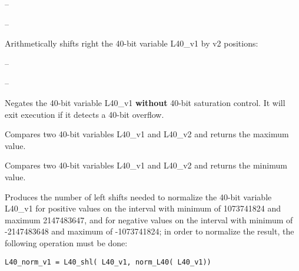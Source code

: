  -- 

 -- 


Arithmetically shifts right the 40-bit variable L40\_v1 by v2
positions: 

 -- 

 -- 


Negates the 40-bit variable L40\_v1 \textbf{without} 40-bit saturation
control. It will exit execution if it detects a 40-bit overflow.


Compares two 40-bit variables L40\_v1 and L40\_v2 and returns the
maximum value.


Compares two 40-bit variables L40\_v1 and L40\_v2 and returns the
minimum value.


Produces the number of left shifts needed to normalize the 40-bit
variable L40\_v1 for positive values on the interval with minimum
of 1073741824 and maximum 2147483647, and for negative values on
the interval with minimum of -2147483648 and maximum of
-1073741824; in order to normalize the result, the following
operation must be done: 

{\tt L40\_norm\_v1 = L40\_shl( L40\_v1, norm\_L40( L40\_v1))}

